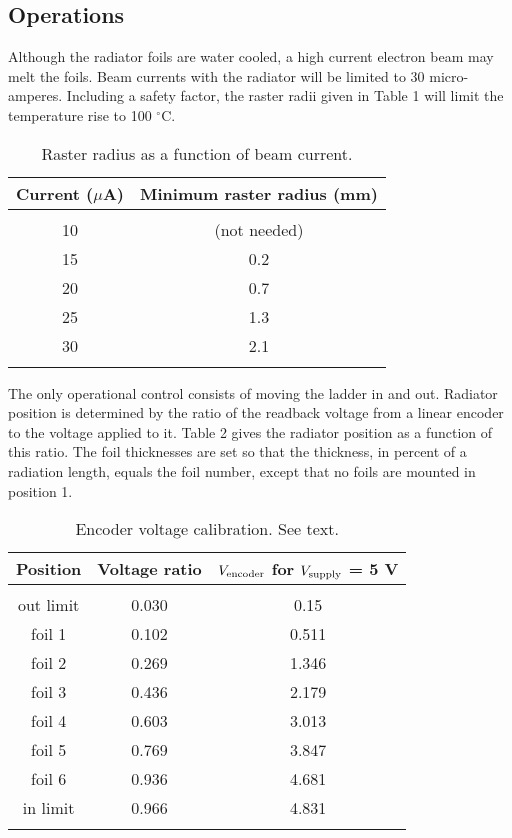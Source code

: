 \subsection{Operations}

Although the radiator foils are water cooled, a high current electron beam
may melt the foils.
Beam currents with the radiator will be limited to 30 micro-amperes.
Including a safety factor, the raster radii given in Table 1
will limit the temperature rise to 100 $^{\circ}$C.

\begin{table}
\begin{center}
\caption[Bremsstrahlung Radiator: Raster Radius]{Raster radius as a function of beam current.}
\begin{tabular}{cc}
\hline
\hline
Current ($\mu$A) & Minimum raster radius (mm) \\
\hline \\
10 & (not needed) \\
15 & 0.2 \\
20 & 0.7 \\
25 & 1.3 \\
30 & 2.1 \\
\hline \hline \\
\end{tabular}
\end{center}
\end{table}

The only operational control consists of moving the ladder in and out.
Radiator position is determined by the ratio of the readback voltage from 
a linear encoder to the voltage applied to it.
Table 2 gives the radiator position as a function of this ratio.
The foil thicknesses are set so that the thickness, in percent
of a radiation length, equals the foil number, except that
no foils are mounted in position 1.

\begin{table}
\begin{center}
\caption[Bremsstrahlung Radiator: Encoder Calibration]{Encoder voltage calibration. See text.}
\begin{tabular}{ccc}
\hline
\hline
Position & Voltage ratio & $V_{\rm encoder}$ for $V_{\rm supply}$ = 5 V \\
\hline \\
out limit & 0.030 & 0.15 \\
 foil 1 & 0.102 & 0.511 \\
 foil 2 & 0.269 & 1.346 \\
 foil 3 & 0.436 & 2.179 \\
 foil 4 & 0.603 & 3.013 \\
 foil 5 & 0.769 & 3.847 \\
 foil 6 & 0.936 & 4.681 \\
 in limit & 0.966 & 4.831 \\
\hline \hline \\
\end{tabular}
\end{center}
\end{table}

